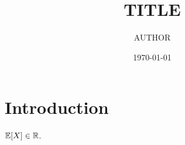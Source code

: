 \documentclass[11pt,a4paper]{scrartcl}
\title{{{TITLE}}}
\author{{{AUTHOR}}}
\date{\today}
\begin{document}
\maketitle

\section{Introduction}\label{sec:intro}
$\mathbb{E}[X] \in \mathbb{R}$.



\end{document}
